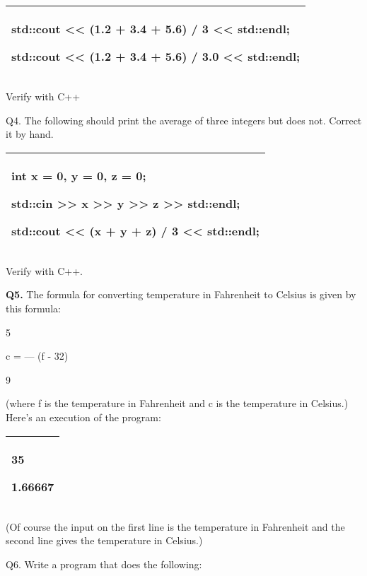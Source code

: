 \documentclass[
]{article}
\begin{document}
\begin{longtable}[]{@{}l@{}}
\toprule
\endhead
\begin{minipage}[t]{0.97\columnwidth}\raggedright
std::cout \textless\textless{} (1.2 + 3.4 + 5.6) / 3
\textless\textless{} std::endl;

std::cout \textless\textless{} (1.2 + 3.4 + 5.6) / 3.0
\textless\textless{} std::endl;\strut
\end{minipage}\tabularnewline
\bottomrule
\end{longtable}

Verify with C++

Q4. The following should print the average of three integers but does
not. Correct it by hand.

\begin{longtable}[]{@{}l@{}}
\toprule
\endhead
\begin{minipage}[t]{0.97\columnwidth}\raggedright
int x = 0, y = 0, z = 0;

std::cin \textgreater\textgreater{} x \textgreater\textgreater{} y
\textgreater\textgreater{} z \textgreater\textgreater{} std::endl;

std::cout \textless\textless{} (x + y + z) / 3 \textless\textless{}
std::endl;\strut
\end{minipage}\tabularnewline
\bottomrule
\end{longtable}

Verify with C++.

\textbf{Q5.} The formula for converting temperature in Fahrenheit to
Celsius is given by this formula:

5

c = --- (f - 32)

9

(where f is the temperature in Fahrenheit and c is the temperature in
Celsius.) Here's an execution of the program:

\begin{longtable}[]{@{}l@{}}
\toprule
\endhead
\begin{minipage}[t]{0.97\columnwidth}\raggedright
35

1.66667\strut
\end{minipage}\tabularnewline
\bottomrule
\end{longtable}

(Of course the input on the first line is the temperature in Fahrenheit
and the second line gives the temperature in Celsius.)

Q6. Write a program that does the following:
\end{document}
